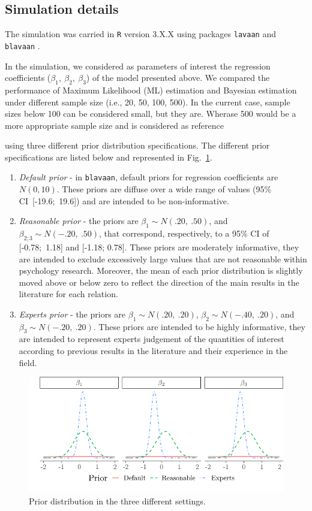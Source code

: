 \documentclass[graybox]{svmult}
\begin{document}
\subsection{Simulation details}

The simulation was carried in \texttt{R} version 3.X.X \cite{rcoreteamLanguageEnvironmentStatistical2018} using packages \texttt{lavaan} \cite{rosseelLavaanPackageStructural2012} and \texttt{blavaan} \cite{merkleBlavaanBayesianStructural2018}.

In the simulation, we  considered as parameters of interest the regression coefficients ($\beta_1,\ \beta_2,\ \beta_3$) of the model presented above. We compared the performance of Maximum Likelihood (ML) estimation and Bayesian estimation under different sample size (i.e., 20, 50, 100, 500). In the current case, sample sizes below 100 can be considered small, but they are. Wherase 500 would be a more appropriate sample size and is considered as reference

 using three different prior distribution specifications. The different prior specifications are listed below and represented in Fig.~\ref{fig:prior}.

\begin{enumerate}
	\item{\textit{Default prior} -  in \texttt{blavaan}, default priors for regression coefficients are $N(0,10)$}. These priors are diffuse over a wide range of values (95\% CI\ [-19.6;\ 19.6]) and are intended to be non-informative.
	\item{\textit{Reasonable prior} - the priors are $\beta_1\sim N(.20,\ .50)$, and  $\beta_{2;3}\sim N(-.20,\ .50)$, that correspond, respectively, to a 95\% CI of  [-0.78;\ 1.18] and  [-1.18; 0.78]. These priors are moderately informative, they are intended to exclude excessively large values that are not reasonable within psychology research. Moreover, the mean of each prior distribution is slightly moved above or below zero to reflect the direction of the main results in the literature for each relation.}
 	\item{\textit{Experts prior} - the priors are $\beta_1\sim N(.20,\ .20)$,  $\beta_{2}\sim N(-.40,\ .20)$}, and $\beta_3\sim N(-.20,\ .20)$. These priors are intended to be highly informative, they are intended to represent experts judgement of the quantities of interest according to previous results in the literature and their experience in the field.
\end{enumerate}

\begin{figure}[b]
	\sidecaption
	\label{fig:prior}
	\includegraphics[width = .64\textwidth]{figure/plot_prior}
	\caption{Prior distribution in the three different settings.}
\end{figure}
\end{document}
